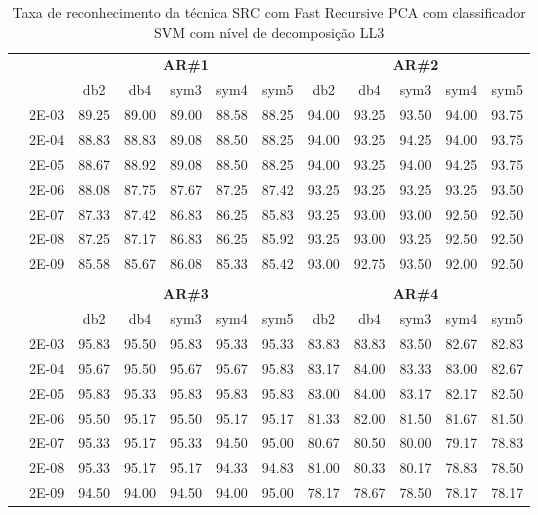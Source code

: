 


\begin{table}[H]
	\centering
    \normalsize
	\caption{Taxa de reconhecimento da técnica SRC com Fast Recursive PCA com classificador SVM com nível de decomposição LL3}
	\begin{tabular}{|c|c|c c c c c|c c c c c|}
\cline{3-12}
\multicolumn{2}{c|}{\multirow{2}{*}{}} & \multicolumn{5}{c|}{\textbf{AR\#1}}  & \multicolumn{5}{c|}{\textbf{AR\#2}} \\\cline{3-12}

\multicolumn{2}{c|}{}  & db2 & db4 & sym3 & sym4 & sym5 & db2 & db4& sym3 & sym4 & sym5 \\\hline
\multicolumn{1}{|c|}{ \multirow{6}{*}{\rotatebox[origin=c]{90}{\textbf{Gamma}}} }
&2E-03&	89.25&	89.00&	89.00&	88.58&	88.25&	94.00	&93.25&	93.50&	94.00&	93.75	\\\cline{2-12}
&2E-04&	88.83&	88.83&	89.08&	88.50&	88.25&	94.00	&93.25&	94.25&	94.00&	93.75	\\\cline{2-12}
&2E-05&	88.67&	88.92&	89.08&	88.50&	88.25&	94.00	&93.25&	94.00&	94.25&	93.75	\\\cline{2-12}
&2E-06&	88.08&	87.75&	87.67&	87.25&	87.42&	93.25	&93.25&	93.25&	93.25&	93.50	\\\cline{2-12}
&2E-07&	87.33&	87.42&	86.83&	86.25&	85.83&	93.25	&93.00&	93.00&	92.50&	92.50	\\\cline{2-12}
&2E-08&	87.25&	87.17&	86.83&	86.25&	85.92&	93.25	&93.00&	93.25&	92.50&	92.50	\\\cline{2-12}
&2E-09&	85.58&	85.67&	86.08&	85.33&	85.42&	93.00	&92.75&	93.50&	92.00&	92.50	



\\ \midrule
\multicolumn{12}{c}{}\\ 

\cline{3-12}
\multicolumn{2}{c}{} & \multicolumn{5}{|c|}{\textbf{AR\#3}}  & \multicolumn{5}{c|}{\textbf{AR\#4}} \\\cline{3-12}
\multicolumn{2}{c}{}  & \multicolumn{1}{|c}{db2} & db4 & sym3 & sym4 & sym5 & db2 & db4& sym3 & sym4 & sym5 \\\hline
\multicolumn{1}{|c|}{ \multirow{6}{*}{\rotatebox[origin=c]{90}{\textbf{Gamma}}} }
&2E-03&	95.83&	95.50&	95.83&	95.33&	95.33&	83.83	&83.83&	83.50&	82.67&	82.83	\\\cline{2-12}
&2E-04&	95.67&	95.50&	95.67&	95.67&	95.83&	83.17	&84.00&	83.33&	83.00&	82.67	\\\cline{2-12}
&2E-05&	95.83&	95.33&	95.83&	95.83&	95.83&	83.00	&84.00&	83.17&	82.17&	82.50	\\\cline{2-12}
&2E-06&	95.50&	95.17&	95.50&	95.17&	95.17&	81.33	&82.00&	81.50&	81.67&	81.50	\\\cline{2-12}
&2E-07&	95.33&	95.17&	95.33&	94.50&	95.00&	80.67	&80.50&	80.00&	79.17&	78.83	\\\cline{2-12}
&2E-08&	95.33&	95.17&	95.17&	94.33&	94.83&	81.00	&80.33&	80.17&	78.83&	78.50	\\\cline{2-12}
&2E-09&	94.50&	94.00&	94.50&	94.00&	95.00&	78.17	&78.67&	78.50&	78.17&	78.17	


\end{tabular}
\end{table}
